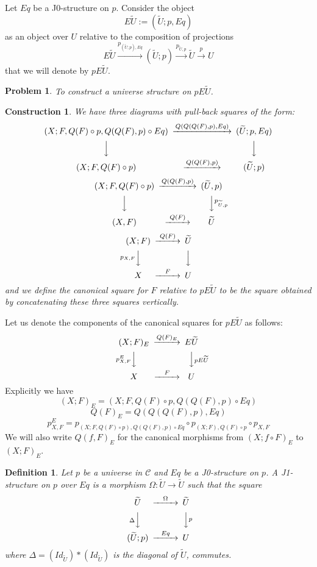 \documentclass[12pt]{article}
\newenvironment{eq}{\begin{equation}}{\end{equation}}
\newtheorem{definition}[proposition]{Definition}
\newtheorem{problem}[proposition]{Problem}
\newtheorem{construction}[proposition]{Construction}
\newcommand{\llabel}[1]{\label{#1}}
\newcommand{\sr}{\rightarrow}
\newcommand{\lr}{\longrightarrow}
\newcommand{\wt}{\widetilde}
\begin{document}
Let $Eq$ be a J0-structure on $p$. Consider the object 
%
$$E\wt{U}:=(\wt{U};p,Eq)$$
%
as an object over $U$ relative to the composition of projections 
%
$$E\wt{U}\stackrel{p_{(\wt{U};p),Eq}}{\lr}(\wt{U};p)\stackrel{p_{\wt{U},p}}{\lr} \wt{U}\stackrel{p}{\sr} U$$
%
that we will denote by $pE\wt{U}$. 
%
\begin{problem}
\llabel{2015.05.08.prob1}
To construct a universe structure on $pE\wt{U}$.
\end{problem}
%
\begin{construction}\rm
\llabel{2015.05.08.constr1}
We have three diagrams with pull-back squares of the form:
%
$$
%
\begin{CD}
(X;F,Q(F)\circ p, Q(Q(F),p)\circ Eq) @>Q(Q(Q(F),p),Eq)>> (\wt{U}; p, Eq)\\
@VVV @VVV\\
(X;F,Q(F)\circ p) @>Q(Q(F),p)>> (\wt{U};p)
\end{CD}
$$$$
\begin{CD}
(X;F,Q(F)\circ p) @>Q(Q(F),p)>> (\wt{U},p)\\
@VVV @VVp_{\wt{U},p}V\\
(X,F) @>Q(F)>> \wt{U}
\end{CD}
$$$$
\begin{CD}
(X;F) @>Q(F)>> \wt{U}\\
@Vp_{X,F} VV @VVV\\
X @>F>> U
\end{CD}
%
$$
%
and we define the canonical square for $F$ relative to $pE\wt{U}$ to be the square obtained by concatenating these three squares vertically. 
\end{construction}
%
Let us denote the components of the canonical squares for $pE\wt{U}$ as follows:
%
$$
\begin{CD}
(X;F)_{E} @>Q(F)_{E}>> E\wt{U}\\
@Vp_{X,F}^{E} VV @VVpE\wt{U} V\\
X @>F>> U
\end{CD}
$$
%
Explicitly we have
%
$$(X;F)_{E}=(X;F,Q(F)\circ p, Q(Q(F),p)\circ Eq)$$
$$Q(F)_{E}=Q(Q(Q(F),p),Eq)$$
$$p_{X,F}^E=p_{(X;F,Q(F)\circ p),Q(Q(F),p)\circ Eq}\circ p_{(X;F),Q(F)\circ p}\circ p_{X,F}$$
%
We will also write $Q(f,F)_{E}$ for the canonical morphisms from $(X;f\circ F)_{E}$ to $(X;F)_{E}$. 
%
\begin{definition}
\llabel{2015.03.27.def5}
Let $p$ be a universe in $\mathcal C$ and $Eq$ be a J0-structure on $p$. A J1-structure on $p$ over $Eq$ is a morphism $\Omega:\wt{U}\sr \wt{U}$ such that the square
%
\begin{eq}\llabel{2015.03.27.sq1}
\begin{CD}
\wt{U} @>\Omega>> \wt{U}\\
@V\Delta VV @VVp V\\
(\wt{U};p) @>Eq >> U
\end{CD}
\end{eq}
%
where $\Delta=(Id_{\wt{U}})*(Id_{\wt{U}})$ is the diagonal of $\wt{U}$, commutes.
\end{definition}
%
\end{document}
